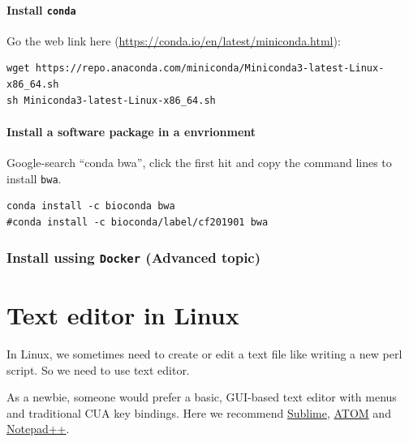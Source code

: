 \documentclass[]{book}
\begin{document}
\hypertarget{install-conda}{%
\subsubsection{\texorpdfstring{Install \texttt{conda}}{Install conda}}\label{install-conda}}

Go the web link here (\url{https://conda.io/en/latest/miniconda.html}):

\begin{verbatim}
wget https://repo.anaconda.com/miniconda/Miniconda3-latest-Linux-x86_64.sh
sh Miniconda3-latest-Linux-x86_64.sh
\end{verbatim}

\hypertarget{install-a-software-package-in-a-envrionment}{%
\subsubsection{Install a software package in a envrionment}\label{install-a-software-package-in-a-envrionment}}

Google-search ``conda bwa'', click the first hit and copy the command lines to install \texttt{bwa}.

\begin{verbatim}
conda install -c bioconda bwa 
#conda install -c bioconda/label/cf201901 bwa 
\end{verbatim}

\hypertarget{install-ussing-docker-advanced-topic}{%
\subsection{\texorpdfstring{Install ussing \texttt{Docker} (Advanced topic)}{Install ussing Docker (Advanced topic)}}\label{install-ussing-docker-advanced-topic}}

\hypertarget{text-editor-in-linux}{%
\chapter{Text editor in Linux}\label{text-editor-in-linux}}

In Linux, we sometimes need to create or edit a text file like writing a new perl script. So we need to use text editor.

As a newbie, someone would prefer a basic, GUI-based text editor with menus and traditional CUA key bindings. Here we recommend \href{https://www.sublimetext.com/}{Sublime}, \href{https://atom.io}{ATOM} and \href{https://notepad-plus-plus.org/}{Notepad++}.
\end{document}
